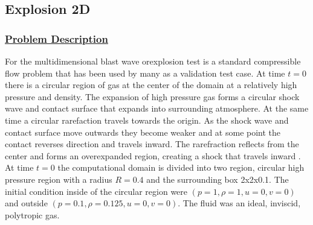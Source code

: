 \subsection*{\center Explosion 2D}
\subsubsection*{\underline{Problem Description}}
For the multidimensional blast wave orexplosion test is a standard compressible
flow problem that has been used by many as a validation test case.  At time
$t=0$ there is a circular region of gas at the center of the domain at a
relatively high pressure and density.  The expansion of high pressure gas
forms a circular shock wave and contact surface that expands into surrounding
atmosphere.  At the same time a circular rarefaction travels towards the
origin.  As the shock wave and contact surface move outwards they become
weaker and at some point the contact reverses direction and travels inward.
The rarefraction reflects from the center and forms an overexpanded region,
creating a shock that travels inward \cite{ref:toro}.  At time $t=0$ the
computational domain is divided into two region, circular high pressure region
with a radius $R=0.4$ and the surrounding box 2x2x0.1.  The initial condition
inside of the circular region were $(p=1, \rho=1, u=0, v=0)$  and outside
$(p=0.1, \rho=0.125, u=0, v=0).$  The fluid was an ideal, inviscid, polytropic gas.
%
